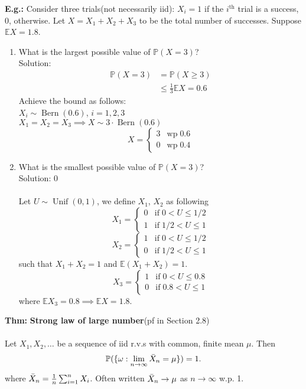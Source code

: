 \documentclass[a4paper]{article}
\newcommand{\n}{\hfill\break}
\newcommand{\eg}[1]{\par\noindent\settowidth{\hangindent}{\textbf{E.g.: }}\textbf{E.g.: }#1\n}
\newcommand{\thm}[1]{\par\noindent\settowidth{\hangindent}{\textbf{Thm: }}\textbf{Thm: }#1\n}
\newcommand{\Prob}{\mathbb{P}}
\renewcommand{\P}{\Prob}
\newcommand{\Avg}{\mathbb{E}}
\newcommand{\E}{\Avg}
\DeclareMathOperator{\Unif}{Unif}
\DeclareMathOperator{\Bern}{Bern}
\begin{document}
\eg{
    Consider three trials(not necessarily iid): $X_i=1$ if the $i^\text{th}$ trial is a success, 0, otherwise. Let $X=X_1+X_2+X_3$ to be the total number of successes. Suppose $\E X=1.8$.
    \begin{enumerate}
        \item What is the largest possible value of $\P(X=3)$? \\
        Solution:
        \begin{align*}
            \P(X=3)&=\P(X\geq3) \\
            &\leq\frac{1}{3}\E X=0.6
        \end{align*}
        Achieve the bound as follows: \\
        $X_i\sim\Bern(0.6)$, $i=1,2,3$ \\
        $X_1=X_2=X_3\implies X\sim3\cdot\Bern(0.6)$
        \[X=\left\{\begin{array}{ll}3 & \text{wp}\;0.6 \\ 0 & \text{wp}\;0.4 \end{array}\right.\]
        \item What is the smallest possible value of $\P(X=3)$? \\
        Solution: 0 \\\\
        Let $U\sim\Unif(0,1)$, we define $X_1$, $X_2$ as following
        \[X_1=\left\{\begin{array}{ll} 0 & \text{if}\;0<U\leq1/2 \\ 1 & \text{if}\;1/2<U\leq1 \end{array}\right.\]
        \[X_2=\left\{\begin{array}{ll} 1 & \text{if}\;0<U\leq1/2 \\ 0 & \text{if}\;1/2<U\leq1 \end{array}\right.\]
        such that $X_1+X_2=1$ and $\E(X_1+X_2)=1$.
        \[X_3=\left\{\begin{array}{ll} 1 & \text{if}\;0<U\leq0.8 \\ 0 & \text{if}\;0.8<U\leq1 \end{array}\right.\]
        where $\E X_3=0.8\implies\E X=1.8$.
    \end{enumerate}
}

\thm{
    \textbf{Strong law of large number}(pf in Section 2.8)
    \\\\
    Let $X_1, X_2,\dots$ be a sequence of iid r.v.s with common, finite mean $\mu$. Then 
    \[\P(\{\omega:\lim_{n\rightarrow\infty}\Bar{X}_n=\mu\})=1.\]
    where $\Bar{X}_n=\frac{1}{n}\sum^n_{i=1}X_i$. Often written $\Bar{X}_n\rightarrow\mu$ as $n\rightarrow\infty$ w.p. 1.
}
\end{document}
